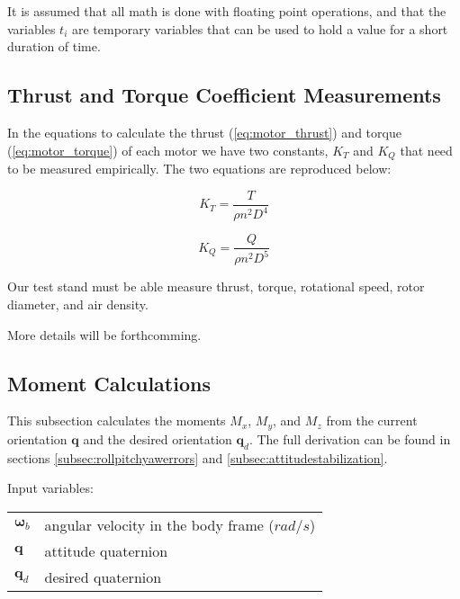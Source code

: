 \documentclass{article}
\numberwithin{equation}{section} %
\newcommand{\bs}[1]{\boldsymbol{#1}}
\begin{document}
It is assumed that all math is done with floating point operations, and that the variables $t_i$ are temporary variables that can be used to hold a value for a short duration of time.


\subsection{Thrust and Torque Coefficient Measurements} \label{subsec:thrustandtorquecoefficientmeasurements}

In the equations to calculate the thrust (\ref{eq:motor_thrust}) and torque (\ref{eq:motor_torque}) of each motor we have two constants, $K_T$ and $K_Q$ that need to be measured empirically. The two equations are reproduced below:

\begin{equation} %
K_T = \frac{T}{\rho n^2 D^4}
\end{equation}

\begin{equation} %
K_Q = \frac{Q}{\rho n^2 D^5}
\end{equation}

Our test stand must be able measure thrust, torque, rotational speed, rotor diameter, and air density.

More details will be forthcomming.

\subsection{Moment Calculations} \label{subsec:momentcalculations}
This subsection calculates the moments $M_x$, $M_y$, and $M_z$ from the current orientation $\bs{q}$ and the desired orientation $\bs{q}_d$. The full derivation can be found in sections \ref{subsec:rollpitchyawerrors} and \ref{subsec:attitudestabilization}.


\bigskip

Input variables:
\begin{tabular}{l l}
 	$ \bs{\omega}_{b} $ 	& angular velocity in the body frame ($rad/s$) \\
 	$ \mathbf{q} $ 			& attitude quaternion \\
 	$ \mathbf{q}_d $		& desired quaternion \\
\end{tabular}
\end{document}
